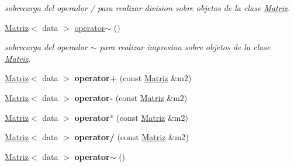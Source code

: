 \begin{DoxyCompactItemize}
\begin{DoxyCompactList}\small\item\em sobrecarga del operador / para realizar division sobre objetos de la clase \hyperlink{classMatriz}{Matriz}. \end{DoxyCompactList}\item 
\hypertarget{classMatriz_aacdea70fa837174ef60b067d7251af0e}{\hyperlink{classMatriz}{Matriz}$<$ data $>$ \hyperlink{classMatriz_aacdea70fa837174ef60b067d7251af0e}{operator$\sim$} ()}\label{classMatriz_aacdea70fa837174ef60b067d7251af0e}

\begin{DoxyCompactList}\small\item\em sobrecarga del operador $\sim$ para realizar impresion sobre objetos de la clase \hyperlink{classMatriz}{Matriz}. \end{DoxyCompactList}\item 
\hypertarget{classMatriz_aec043c8f20a1d02b911c3c5bbf912c97}{\hyperlink{classMatriz}{Matriz}$<$ data $>$ {\bfseries operator+} (const \hyperlink{classMatriz}{Matriz} \&m2)}\label{classMatriz_aec043c8f20a1d02b911c3c5bbf912c97}

\item 
\hypertarget{classMatriz_af2bca931213911ba659e8c18e33f2a19}{\hyperlink{classMatriz}{Matriz}$<$ data $>$ {\bfseries operator-\/} (const \hyperlink{classMatriz}{Matriz} \&m2)}\label{classMatriz_af2bca931213911ba659e8c18e33f2a19}

\item 
\hypertarget{classMatriz_a84af7a1a5e43a077dade2615b0b4d4b0}{\hyperlink{classMatriz}{Matriz}$<$ data $>$ {\bfseries operator$\ast$} (const \hyperlink{classMatriz}{Matriz} \&m2)}\label{classMatriz_a84af7a1a5e43a077dade2615b0b4d4b0}

\item 
\hypertarget{classMatriz_af268d0fabd8687a38b7e690749170031}{\hyperlink{classMatriz}{Matriz}$<$ data $>$ {\bfseries operator/} (const \hyperlink{classMatriz}{Matriz} \&m2)}\label{classMatriz_af268d0fabd8687a38b7e690749170031}

\item 
\hypertarget{classMatriz_ae59411f406c1c7c8b769351f3b736559}{\hyperlink{classMatriz}{Matriz}$<$ data $>$ {\bfseries operator$\sim$} ()}\label{classMatriz_ae59411f406c1c7c8b769351f3b736559}

\end{DoxyCompactItemize}

